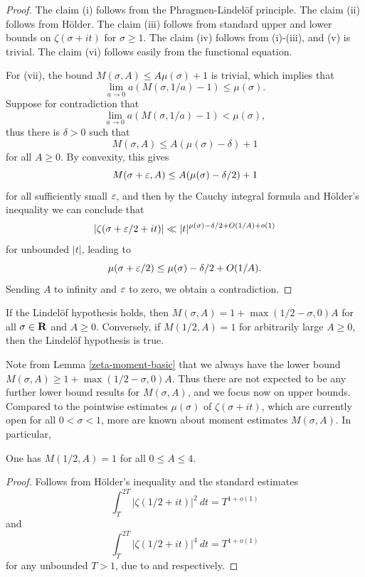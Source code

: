 \begin{proof} The claim (i) follows from the Phragmen-Lindel\"of principle.  The claim (ii) follows from H\"older.  The claim (iii) follows from standard upper and lower bounds on $\zeta(\sigma+it)$ for $\sigma \geq 1$. The claim (iv) follows from (i)-(iii), and (v) is trivial. The claim (vi) follows easily from the functional equation.

For (vii), the bound $M(\sigma,A) \leq A \mu(\sigma) + 1$ is trivial, which implies that
$$ \lim_{a \to 0} a(M(\sigma,1/a)-1) \leq \mu(\sigma).$$
Suppose for contradiction that
$$ \lim_{a \to 0} a(M(\sigma,1/a)-1) < \mu(\sigma),$$
thus there is $\delta>0$ such that
$$M(\sigma,A) \leq A (\mu(\sigma)-\delta) + 1$$
for all $A\geq 0$.  By convexity, this gives
$$M(\sigma+\varepsilon,A) \leq A (\mu(\sigma)-\delta/2) + 1$$
for all sufficiently small $\varepsilon$, and then by the Cauchy integral formula and H\"older's inequality we can conclude that
$$ |\zeta(\sigma+\varepsilon/2 +it)| \ll |t|^{\mu(\sigma)-\delta/2 + O(1/A) + o(1)} $$
for unbounded $|t|$, leading to
$$ \mu(\sigma+\varepsilon/2) \leq \mu(\sigma)-\delta/2 + O(1/A).$$
Sending $A$ to infinity and $\varepsilon$ to zero, we obtain a contradiction.
\end{proof}

\begin{corollary}\label{moment_from_lindelof} If the Lindel\"of hypothesis holds, then $M(\sigma,A) = 1 + \max(1/2-\sigma,0) A$ for all $\sigma \in \mathbf{R}$ and $A \geq 0$. Conversely, if $M(1/2, A) = 1$ for arbitrarily large $A \ge 0$, then the Lindel\"of hypothesis is true.
\end{corollary}

Note from Lemma \ref{zeta-moment-basic} that we always have the lower bound $M(\sigma,A) \geq 1 + \max(1/2-\sigma,0) A$.  Thus there are not expected to be any further lower bound results for $M(\sigma,A)$, and we focus now on upper bounds. Compared to the pointwise estimates $\mu(\sigma)$ of $\zeta(\sigma + it)$, which are currently open for all $0 < \sigma < 1$, more are known about moment estimates $M(\sigma, A)$. In particular,

\begin{lemma}\label{mad_known_est}One has $M(1/2,A)=1$ for all $0 \leq A \leq 4$.
\end{lemma}
\begin{proof}
Follows from H\"older's inequality and the standard estimates
$$ \int_T^{2T} |\zeta(1/2+it)|^2\ dt = T^{1+o(1)}$$
and
$$ \int_T^{2T} |\zeta(1/2+it)|^4\ dt = T^{1+o(1)}$$
for any unbounded $T>1$, due to \cite{hardy_contributions_1916} and \cite{hardy_littlewood_approximate_1923} respectively.
\end{proof}

